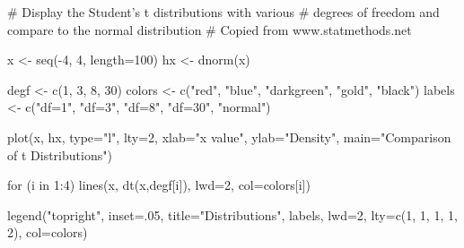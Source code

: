 \documentclass[10pt,]{book}
\numberwithin{equation}{section}
\begin{document}
%
\par
\hypertarget{p-1264}{}%
\leavevmode%
\begin{sageinput}
# Display the Student's t distributions with various
# degrees of freedom and compare to the normal distribution
# Copied from www.statmethods.net

x <- seq(-4, 4, length=100)
hx <- dnorm(x)

degf <- c(1, 3, 8, 30)
colors <- c("red", "blue", "darkgreen", "gold", "black")
labels <- c("df=1", "df=3", "df=8", "df=30", "normal")

plot(x, hx, type="l", lty=2, xlab="x value",
  ylab="Density", main="Comparison of t Distributions")

for (i in 1:4){
  lines(x, dt(x,degf[i]), lwd=2, col=colors[i])
}

legend("topright", inset=.05, title="Distributions",
  labels, lwd=2, lty=c(1, 1, 1, 1, 2), col=colors)
\end{sageinput}
%
%
%
\typeout{************************************************}
\typeout{************************************************}
%
\end{document}
